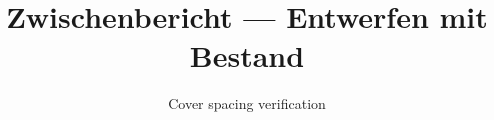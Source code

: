 \documentclass[type=zwischenbericht,theme=dark]{zukunftbau}
\title{Zwischenbericht --- Entwerfen mit Bestand}
\subtitle{Cover spacing verification}
\begin{document}
\makecoverpages
\end{document}
